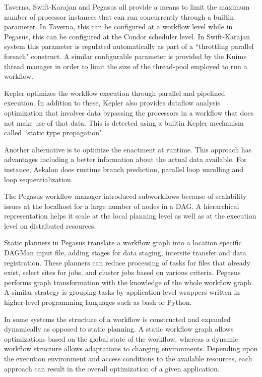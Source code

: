 Taverna, Swift-Karajan and Pegasus all provide a means to limit the maximum
number of processor instances that can run concurrently through a builtin
parameter. In Taverna, this can be configured at a workflow level while in
Pegasus, this can be configured at the Condor \cite{thain-tannenbaum-etal:2005}
scheduler level. In Swift-Karajan system this parameter is regulated
automatically as part of a ``throttling parallel foreach" construct. A similar
configurable parameter is provided by the Knime thread manager in order to
limit the size of the thread-pool employed to run a workflow.

Kepler optimizes the workflow execution through parallel and pipelined
execution. In addition to these, Kepler also provides dataflow analysis
optimization that involves data bypassing the processors in a workflow that
does not make use of that data. This is detected using a builtin Kepler
mechanism called ``static type propagation".

Another alternative is to optimize the enactment at runtime. This approach has
advantages including a better information about the actual data available. For
instance, Askalon does runtime branch prediction, parallel loop unrolling and
loop sequentialization.

The Pegasus workflow manager introduced subworkflows because of scalability
issues at the localhost for a large number of nodes in a DAG. A hierarchical
representation helps it scale at the local planning level as well as at the
execution level on distributed resources.

Static planners in Pegasus translate a workflow graph into a location specific
DAGMan input file, adding stages for data staging, intersite transfer and data
registration. These planners can reduce processing of tasks for files that
already exist, select sites for jobs, and cluster jobs based on various
criteria. Pegasus performs graph transformation with the knowledge of the whole
workflow graph. A similar strategy is grouping tasks by application-level
wrappers written in higher-level programming languages such as bash or Python.

In some systems the structure of a workflow is constructed and expanded
dynamically as opposed to static planning. A static workflow graph allows
optimizations based on the global state of the workflow, whereas a dynamic
workflow structure allows adaptations to changing environments.  Depending upon
the execution environment and access conditions to the available resources,
each approach can result in the overall optimization of a given application.


